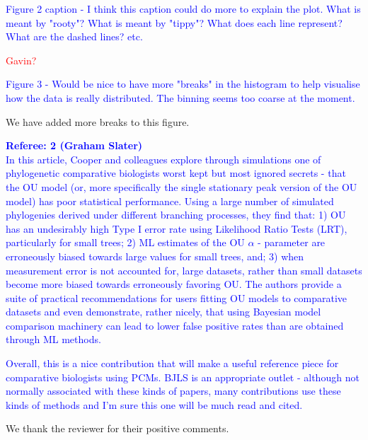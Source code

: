 \documentclass[12pt]{letter}
\begin{document}
\begin{letter}{}
\textcolor{blue}{Figure 2 caption - I think this caption could do more to explain the plot. What is meant by "rooty"? What is meant by "tippy"? What does each line represent? What are the dashed lines? etc.}

\textcolor{red}{Gavin?}

\textcolor{blue}{Figure 3 - Would be nice to have more "breaks" in the histogram to help visualise how the data is really distributed. The binning seems too coarse at the moment.}

We have added more breaks to this figure.

\textcolor{blue}{\textbf{Referee: 2 (Graham Slater)}\\
In this article, Cooper and colleagues explore through simulations one of phylogenetic comparative biologists worst kept but most ignored secrets - that the OU model (or, more specifically the single stationary peak version of the OU model) has poor statistical performance. Using a large number of simulated phylogenies derived under different branching processes, they find that: 1) OU has an undesirably high Type I error rate using Likelihood Ratio Tests (LRT), particularly for small trees; 2) ML estimates of the OU $\alpha$ - parameter are erroneously biased towards large values for small trees, and; 3) when measurement error is not accounted for, large datasets, rather than small datasets become more biased towards erroneously favoring OU. The authors provide a suite of practical recommendations for users fitting OU models to comparative datasets and even demonstrate, rather nicely, that using Bayesian model comparison machinery can lead to lower false positive rates than are obtained through ML methods.}

\textcolor{blue}{Overall, this is a nice contribution that will make a useful reference piece for comparative biologists using PCMs. BJLS is an appropriate outlet - although not normally associated with these kinds of papers, many contributions use these kinds of methods and I'm sure this one will be much read and cited.}

We thank the reviewer for their positive comments.


\end{letter}
\end{document}
